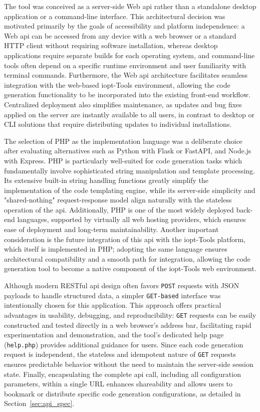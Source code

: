 The tool was conceived as a server-side Web \gls{api} rather than a standalone desktop application or a command-line interface. This architectural decision was motivated primarily by the goals of accessibility and platform independence: a Web \gls{api} can be accessed from any device with a web browser or a standard HTTP client without requiring software installation, whereas desktop applications require separate builds for each operating system, and command-line tools often depend on a specific runtime environment and user familiarity with terminal commands. Furthermore, the Web \gls{api} architecture facilitates seamless integration with the web-based \gls{iopt}-Tools environment, allowing the code generation functionality to be incorporated into the existing front-end workflow. Centralized deployment also simplifies maintenance, as updates and bug fixes applied on the server are instantly available to all users, in contrast to desktop or CLI solutions that require distributing updates to individual installations.

The selection of PHP as the implementation language was a deliberate choice after evaluating alternatives such as Python with Flask or FastAPI, and Node.js with Express. PHP is particularly well-suited for code generation tasks which fundamentally involve sophisticated string manipulation and template processing. Its extensive built-in string handling functions greatly simplify the implementation of the code templating engine, while its server-side simplicity and "shared-nothing" request-response model align naturally with the stateless operation of the \gls{api}. Additionally, PHP is one of the most widely deployed back-end languages, supported by virtually all web hosting providers, which ensures ease of deployment and long-term maintainability. Another important consideration is the future integration of this \gls{api} with the \gls{iopt}-Tools platform, which itself is implemented in PHP; adopting the same language ensures architectural compatibility and a smooth path for integration, allowing the code generation tool to become a native component of the \gls{iopt}-Tools web environment.

Although modern RESTful \gls{api} design often favors \texttt{POST} requests with JSON payloads to handle structured data, a simpler \texttt{GET-based} interface was intentionally chosen for this application. This approach offers practical advantages in usability, debugging, and reproducibility: \texttt{GET} requests can be easily constructed and tested directly in a web browser's address bar, facilitating rapid experimentation and demonstration, and the tool's dedicated help page (\texttt{help.php}) provides additional guidance for users. Since each code generation request is independent, the stateless and idempotent nature of \texttt{GET} requests ensures predictable behavior without the need to maintain the server-side session state. Finally, encapsulating the complete \gls{api} call, including all configuration parameters, within a single URL enhances shareability and allows users to bookmark or distribute specific code generation configurations, as detailed in Section~\ref{sec:api_spec}.

